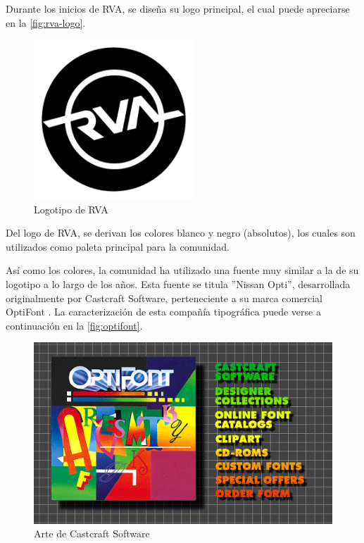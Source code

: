 Durante los inicios de RVA, se diseña su logo principal, el cual puede apreciarse en la \autoref{fig:rva-logo}.

\begin{figure}[H]
  \begin{center}
    \includegraphics[width=6cm, height=6cm]{img/rva.png} 
  \end{center}
  \caption[Logotipo de RVA]{Logotipo de RVA}
  \label{fig:rva-logo}
\end{figure}

Del logo de RVA, se derivan los colores blanco y negro (absolutos), los cuales son utilizados como paleta principal para la comunidad.

Así como los colores, la comunidad ha utilizado una fuente muy similar a la de su logotipo a lo largo de los años. Esta fuente se titula ''Nissan Opti'', desarrollada originalmente por Castcraft Software, perteneciente a su marca comercial OptiFont \cite{optifont}. La caracterización de esta compañía tipográfica puede verse a continuación en la \autoref{fig:optifont}.

\begin{figure}[H]
  \begin{center}
    \includegraphics{img/optifont.png} 
  \end{center}
  \caption[Arte de Castcraft Software]{Arte de Castcraft Software}
  \label{fig:optifont}
\end{figure}

